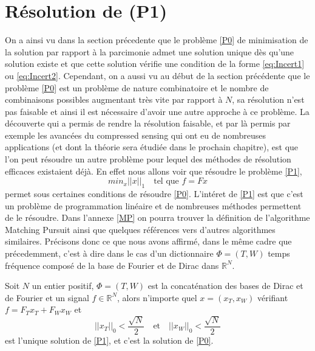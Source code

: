 \section{Résolution de (P1)}
On a ainsi vu dans la section précedente que le problème \ref{P0} de minimisation de la solution par rapport à la parcimonie admet une solution unique dès qu'une solution existe et que cette solution vérifie une condition de la forme \ref{eq:Incert1} ou \ref{eq:Incert2}.
Cependant, on a aussi vu au début de la section précédente que le problème \ref{P0} est un problème de nature combinatoire et le nombre de combinaisons possibles augmentant très vite par rapport à $N$, sa résolution n'est pas faisable et ainsi il est nécessaire d'avoir une autre approche à ce problème.
\newline
La découverte qui a permis de rendre la résolution faisable, et par là permis par exemple les avancées du compressed sensing qui ont eu de nombreuses applications (et dont la théorie sera étudiée dans le prochain chapitre), est que l'on peut résoudre un autre problème pour lequel des méthodes de résolution efficaces existaient déjà.
En effet nous allons voir que résoudre le problème \ref{P1},
\begin{equation}\label{P1}\tag{P1}
	min_x ||x||_1 \quad\text{tel que } f = Fx 
\end{equation}
permet sous certaines conditions de résoudre \ref{P0}.
L'intéret de \ref{P1} est que c'est un problème de programmation linéaire et de nombreuses méthodes permettent de le résoudre.
Dans l'annexe \ref{MP} on pourra trouver la définition de l'algorithme Matching Pursuit ainsi que quelques références vers d'autres algorithmes similaires.
Précisons donc ce que nous avons affirmé, dans le même cadre que précedemment, c'est à dire dans le cas d'un dictionnaire $\Phi = (T,W)$ temps fréquence composé de la base de Fourier et de Dirac dans $\mathbb{R}^N$.
\begin{theoreme}\label{th:DiracFourier}
	Soit $N$ un entier positif, $\Phi = (T, W)$ est la concaténation des bases de Dirac et de Fourier et un signal $f\in \mathbb{R}^N$, alors n'importe quel $x = (x_T, x_W)$ vérifiant $f = F_T x_T + F_W x_W$ et
	\begin{equation}\label{eq:cond1}
		||x_T||_0 < \frac{\sqrt{N}}{2} \quad \text{et} \quad   ||x_W||_0 < \frac{\sqrt{N}}{2}
	\end{equation}
	est l'unique solution de \ref{P1}, et c'est la solution de \ref{P0}.
\end{theoreme}
